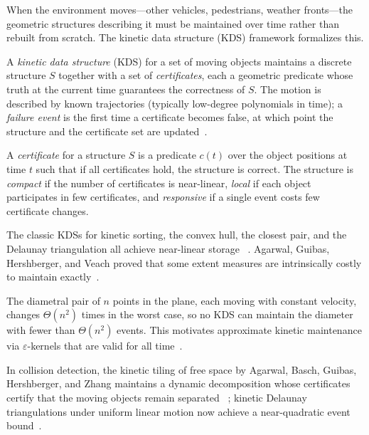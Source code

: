When the environment moves---other vehicles,
pedestrians, weather fronts---the geometric structures describing it must be
maintained over time rather than rebuilt from scratch. The kinetic data
structure (KDS) framework formalizes this.

\begin{definition}\label{def:frontiers_kds}
A \emph{kinetic data structure} (KDS) for a set of moving objects maintains a
discrete structure $S$ together with a set of \emph{certificates}, each a
geometric predicate whose truth at the current time guarantees the correctness
of $S$. The motion is described by known trajectories (typically low-degree
polynomials in time); a \emph{failure event} is the first time a certificate
becomes false, at which point the structure and the certificate set are
updated~\cite{guibas1998,basch1999}.
\end{definition}

\begin{definition}[Certificate]\label{def:frontiers_certificate}
A \emph{certificate} for a structure $S$ is a predicate $c(t)$ over the object
positions at time $t$ such that if all certificates hold, the structure is
correct. The structure is \emph{compact} if the number of certificates is
near-linear, \emph{local} if each object participates in few certificates, and
\emph{responsive} if a single event costs few certificate changes.
\end{definition}

The classic KDSs for kinetic sorting, the convex hull, the closest pair, and
the Delaunay triangulation all achieve near-linear storage
~\cite{basch1999,guibas1998}. Agarwal, Guibas, Hershberger, and Veach proved
that some extent measures are intrinsically costly to maintain
exactly~\cite{agarwal2001extent}.

\begin{theorem}\label{thm:frontiers_kinetic_bounds}
The diametral pair of $n$ points in the plane, each moving with constant
velocity, changes $\Theta(n^2)$ times in the worst case, so no KDS can
maintain the diameter with fewer than $\Theta(n^2)$ events. This motivates
approximate kinetic maintenance via $\varepsilon$-kernels that are valid for
all time~\cite{agarwal2001extent,guibas1998}.
\end{theorem}

In collision detection, the kinetic tiling of free space by Agarwal, Basch,
Guibas, Hershberger, and Zhang maintains a dynamic decomposition whose
certificates certify that the moving objects remain separated
~\cite{agarwal2002kinetic}; kinetic Delaunay triangulations under uniform
linear motion now achieve a near-quadratic event bound~\cite{rubin2016}.

